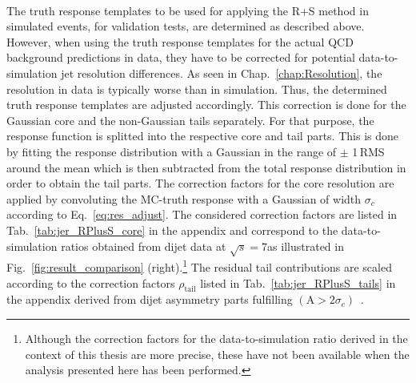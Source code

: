\begin{table}[!t]
\centering
\caption{Overview of the $|\eta^\mathrm{gen}|$ and $\pt^\mathrm{gen}$ interval boundaries for the MC-truth response determination used as input for the R+S method.}
\label{tab:RPlusS_binning}
\end{table} 
\\
The truth response templates to be used for applying the R+S method in simulated events, \eg for validation tests, are determined as described above. However, when using the truth response templates for the actual QCD background predictions in data, they have to be corrected for potential data-to-simulation jet resolution differences. As seen in Chap.~\ref{chap:Resolution}, the resolution in data is typically worse than in simulation. Thus, the determined truth response templates are adjusted accordingly. This correction is done for the Gaussian core and the non-Gaussian tails separately. For that purpose, the response function is splitted into the respective core and tail parts. This is done by fitting the response distribution with a Gaussian in the range of $\pm$ 1\,RMS around the mean which is then subtracted from the total response distribution in order to obtain the tail parts. The correction factors for the core resolution are applied by convoluting the MC-truth response with a Gaussian of width $\sigma_{c}$ according to Eq.~\ref{eq:res_adjust}. The considered correction factors are listed in Tab.~\ref{tab:jer_RPlusS_core} in the appendix and correspond to the data-to-simulation ratios obtained from dijet data at $\sqrt{s} = 7$\tev as illustrated in Fig.~\ref{fig:result_comparison} (right).\footnote{Although the correction factors for the data-to-simulation ratio derived in the context of this thesis are more precise, these have not been available when the analysis presented here has been performed.} The residual tail contributions are scaled according to the correction factors $\rho_\mathrm{tail}$ listed in Tab.~\ref{tab:jer_RPlusS_tails} in the appendix derived from dijet asymmetry parts fulfilling $(\mathrm{A} > 2 \sigma_c)$~\cite{thesis:Schroeder}.    

